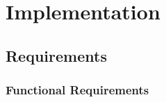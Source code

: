 \documentclass[11pt]{article}
\begin{document}
\begin{figure}
\begin{minipage}[c]{0.35\textwidth}
                \end{minipage}
            \end{figure}
                        \clearpage
            

\newpage
\section{Implementation}

\subsection{Requirements}
    
    \subsubsection{Functional Requirements}
    
\end{document}
